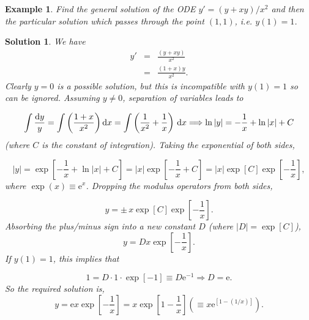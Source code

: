 \documentclass[a4paper]{report}
\newtheorem{example}{Example}[chapter]
\newtheorem*{solution}{Solution}
\begin{document}
\begin{example}
\label{ex:first:separable2}
Find the general solution of the ODE $y'=(y+xy)/x^2$ and then the particular solution which passes through the point $(1,1)$, i.e. $y(1)=1$.
\end{example}

\begin{solution}
We have
\begin{eqnarray*}
y'&=&\frac{(y+xy)}{x^2}
\\
&=&\frac{(1+x)y}{x^2}.
\end{eqnarray*}
Clearly $y=0$ is a possible solution, but this is incompatible with $y(1)=1$ so can be ignored. Assuming $y\neq0$, separation of variables leads to 

\begin{displaymath}
\int \frac{{\rm d}y}{y}=\int \left(\frac{1+x}{x^2}\right){\rm d}x = \int \left(\frac{1}{x^2}+\frac{1}{x}\right)\,\mathrm{d}x \Longrightarrow 
\ln|y|=-\frac{1}{x}+\ln|x| + C
\end{displaymath}
(where $C$ is the constant of integration). Taking the exponential of both sides,

\begin{displaymath}
|y|=\exp\left[-\frac{1}{x}+\ln |x| + C\right]=|x|\exp\left[-\frac{1}{x}+C\right]= |x|\exp[C]\exp\left[-\frac{1}{x}\right],
\end{displaymath}
\noindent where $\displaystyle{\exp(x)\equiv\mathrm{e}^x}$. Dropping the modulus operators from both sides,

\begin{displaymath}
y = \pm \,x \exp[C]\exp\left[-\frac{1}{x}\right].
\end{displaymath}
\noindent Absorbing the plus/minus sign into a new constant $D$ (where $|D|=\exp[C]$),
\begin{displaymath}
y=D x \exp\left[-\frac{1}{x}\right].
\end{displaymath}
If $y(1)=1$, this implies that

\begin{displaymath}
1=D\cdot 1 \cdot \exp[-1] \equiv D\mathrm{e}^{-1} \Rightarrow D=\mathrm{e}.
\end{displaymath}
So the required solution is,
\begin{displaymath}
y=\mathrm{e}x\exp\left[-\frac{1}{x}\right] = x \exp\left[1-\frac{1}{x}\right] \left(\equiv x \mathrm{e}^{\left[1-\left(1/x\right)\right]}\right).
\end{displaymath}

\end{solution}
\end{document}
